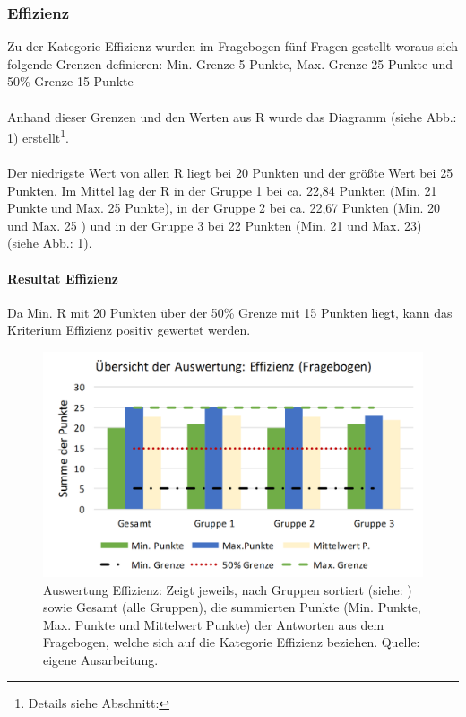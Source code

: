 \documentclass[Bachelorarbeit.tex]{subfiles}
\begin{document}
\subsubsection{Effizienz}
Zu der Kategorie Effizienz wurden im Fragebogen fünf Fragen gestellt woraus sich folgende Grenzen definieren: Min. Grenze 5 Punkte, Max. Grenze 25 Punkte und 50\% Grenze 15 Punkte\\
\\
Anhand dieser Grenzen und den Werten aus R wurde das Diagramm  (siehe Abb.: \ref{fig:AuswertungEffizienz}) erstellt\footnote{Details siehe Abschnitt: }.\\
\\
Der niedrigste Wert von allen R liegt bei 20 Punkten und der größte Wert bei 25 Punkten.
Im Mittel lag der R in der Gruppe 1 bei ca. 22,84 Punkten (Min. 21 Punkte und Max. 25 Punkte), in der Gruppe 2 bei ca. 22,67 Punkten (Min. 20 und Max. 25 ) und in der Gruppe 3 bei 22 Punkten (Min. 21 und Max. 23)\\
(siehe Abb.: \ref{fig:AuswertungEffizienz}).

\paragraph{Resultat Effizienz} Da Min. R mit 20 Punkten über der 50\% Grenze mit 15 Punkten liegt, kann das Kriterium Effizienz positiv gewertet werden.

\begin{figure}[H]
\centering
\includegraphics[width=0.9\linewidth]{img/Evaluation/Usability/AuswertungEffizienz}
\caption[Übersicht der Effizienz]{Auswertung Effizienz: Zeigt jeweils, nach Gruppen sortiert (siehe: ) sowie Gesamt (alle Gruppen), die summierten Punkte (Min. Punkte, Max. Punkte und Mittelwert Punkte) der Antworten aus dem Fragebogen, welche sich auf die Kategorie Effizienz beziehen. Quelle: eigene Ausarbeitung.}
\label{fig:AuswertungEffizienz}
\end{figure}
\end{document}
